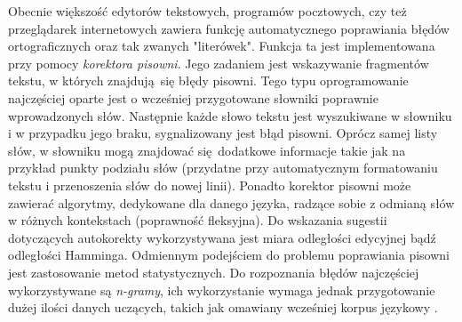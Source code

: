 \documentclass[a4paper, twoside, 12pt]{report}
\begin{document}
            Obecnie większość edytorów tekstowych, programów pocztowych, czy też przeglądarek internetowych zawiera
            funkcję automatycznego poprawiania błędów ortograficznych
            oraz tak zwanych "literówek". Funkcja ta jest implementowana przy pomocy \emph{korektora pisowni}. Jego
            zadaniem jest wskazywanie fragmentów tekstu, w których znajdują się błędy pisowni. Tego typu oprogramowanie
            najczęściej oparte jest o wcześniej przygotowane słowniki poprawnie wprowadzonych słów. Następnie każde
            słowo tekstu jest wyszukiwane w słowniku i w przypadku jego braku, sygnalizowany jest błąd pisowni. Oprócz
            samej listy słów, w słowniku mogą znajdować się dodatkowe informacje takie jak na przykład punkty podziału
            słów (przydatne przy automatycznym formatowaniu tekstu i przenoszenia słów do nowej linii). Ponadto korektor
            pisowni może zawierać algorytmy, dedykowane dla danego języka, radzące sobie z odmianą słów w różnych
            kontekstach (poprawność fleksyjna). Do wskazania sugestii dotyczących autokorekty wykorzystywana jest miara
            odległości edycyjnej bądź odległości Hamminga. Odmiennym podejściem do problemu poprawiania pisowni jest zastosowanie
            metod statystycznych. Do rozpoznania błędów najczęściej wykorzystywane są \emph{n-gramy}, ich wykorzystanie
            wymaga jednak przygotowanie dużej ilości danych uczących, takich jak omawiany wcześniej korpus językowy
            \cite{SPELLCHECKING}.
\end{document}

